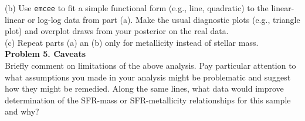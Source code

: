 \documentclass{article}
\begin{document}
(b) Use \texttt{emcee} to fit a simple functional form (e.g., line, quadratic) to the linear-linear or log-log data from part (a).   Make the usual diagnostic plots (e.g., triangle plot) and overplot draws from your posterior on the real data. \\

(c) Repeat parts (a) an (b) only for metallicity instead of stellar mass. \\


\noindent \textbf{Problem 5. Caveats} \\

Briefly comment on limitations of the above analysis.  Pay particular attention to what assumptions you made in your analysis might be problematic and suggest how they might be remedied.  Along the same lines, what data would improve determination of the SFR-mass or SFR-metallicity relationships for this sample and why?
\end{document}
